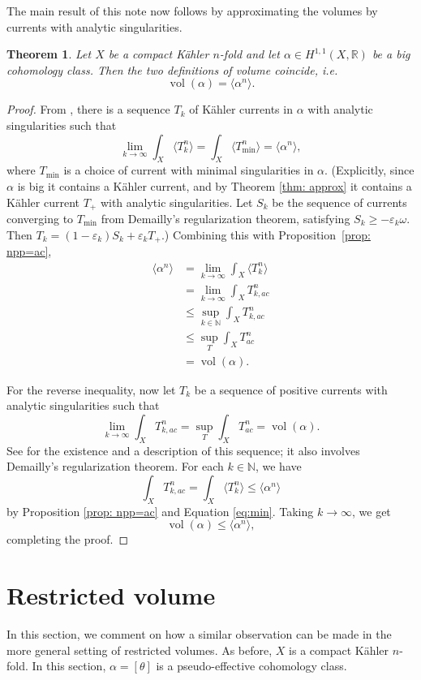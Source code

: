 \documentclass[a4paper]{amsart}
\newcommand{\R}{\mathbb{R}}
\newcommand{\N}{\mathbb{N}}
\newcommand{\vol}{\operatorname{vol}}
\newtheorem{theorem}{Theorem}[section]
\theoremstyle{definition}
\begin{document}
The main result of this note now follows by approximating the volumes by currents with analytic singularities.
\begin{theorem}\label{thm:main}
	Let $X$ be a compact K\"ahler $n$-fold and let $\alpha \in H^{1, 1}(X, \R)$ be a big cohomology class. Then the two definitions of volume coincide, i.e.\
	\[\vol(\alpha) = \langle \alpha^n\rangle.\]
\end{theorem}
\begin{proof}
From \cite[Proposition 1.18]{BEGZ}, there is a sequence $T_k$ of K\"ahler currents in $\alpha$ with analytic singularities such that
\[\lim_{k\to\infty}\int_X \langle T^n_{k} \rangle = \int_X \langle T^n_{\text{min}}\rangle = \langle \alpha^n\rangle,\]
where $T_{\min}$ is a choice of current with minimal singularities in $\alpha$. (Explicitly, since $\alpha$ is big it contains a K\"ahler current, and by Theorem \ref{thm: approx} it contains a K\"ahler current $T_+$ with analytic singularities. Let $S_k$ be the sequence of currents converging to $T_{\min}$ from Demailly's regularization theorem, satisfying $S_k \ge -\varepsilon_k\omega$. Then $T_k = (1-\varepsilon_k)S_k + \varepsilon_k T_+$.) Combining this with Proposition~\ref{prop: npp=ac},
\begin{align*}
	\langle \alpha^n\rangle &= \lim_{k\to\infty}\int_X \langle T^n_{k} \rangle\\
	&= \lim_{k\to\infty} \int_X T^n_{k, ac}\label{eq:npp=ac}\\
	&\le \sup_{k\in \N} \int_X T^n_{k,ac}\\
	&\le \sup_T \int_X T^n_{ac}\\
    &=\vol(\alpha).
\end{align*}

For the reverse inequality, now let $T_k$ be a sequence of positive currents  with analytic singularities such that \[\lim_{k\to\infty} \int_X T^n_{k, ac} = \sup_T \int_X T^n_{ac} = \vol(\alpha).\]
See \cite[Lemma 4.4]{Boucksom} for the existence and a description of this sequence; it also involves Demailly's regularization theorem. For each $k \in \N$, we have
\[\int_X T^n_{k, ac} = \int_X \langle T^n_{k} \rangle \le \langle\alpha^n\rangle\]
by Proposition \ref{prop: npp=ac} and Equation \eqref{eq:min}. Taking $k\to\infty$, we get
\[\vol(\alpha) \le \langle \alpha^n\rangle,\]
completing the proof.
\end{proof}
\section{Restricted volume}\label{sec: restricted}
In this section, we comment on how a similar observation can be made in the more general setting of restricted volumes. As before, $X$ is a compact K\"ahler $n$-fold. In this section, $\alpha = [\theta]$ is a pseudo-effective cohomology class.
\end{document}
